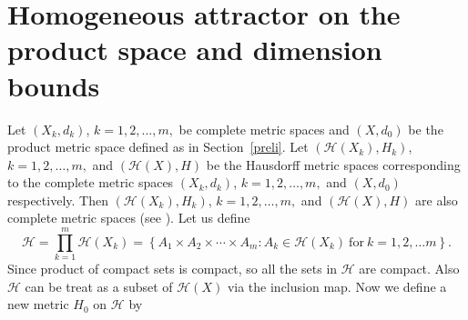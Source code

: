 \documentclass[10pt]{amsart}
\theoremstyle{definition}
\begin{document}
	\section{Homogeneous attractor on the product space and dimension bounds}
	\label{pohm}
	Let $(X_k,d_k)$,  $k=1,2,\ldots,m,$  be complete metric spaces and $(X,d_0)$ be the product metric space defined as in Section~\ref{preli}.  Let $(\mathscr{H}(X_k),H_k)$, $k=1,2,\ldots,m,$ and $(\mathscr{H}(X),H)$ be the Hausdorff metric spaces corresponding to the complete metric spaces $(X_k,d_k)$,  $k=1,2,\ldots,m,$ and $(X,d_0)$ respectively. Then $(\mathscr{H}(X_k),H_k)$, $k=1,2,\ldots,m,$ and $(\mathscr{H}(X),H)$ are also complete metric spaces (see \cite{FE}). Let us define
	\begin{equation}
		\mathscr{H}=\prod_{k=1}^m\mathscr{H}(X_k)=\left\{A_1\times A_2
		\times\cdots\times A_m:A_k\in \mathscr{H}(X_k)~\mbox{for}~k=1,2,\ldots m\right\}.
		\label{p of h}
	\end{equation}
	Since product of compact sets is compact, so all the sets in $\mathscr{H}$ are compact. Also $\mathscr{H}$ can be treat as a subset of $\mathscr{H}(X)$ via the inclusion map. Now we define a new metric $H_0$ on $\mathscr{H}$ by
	
\end{document}
